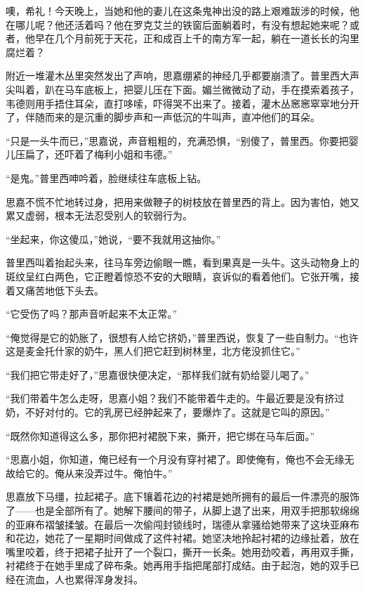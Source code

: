 \par 噢，希礼！今天晚上，当她和他的妻儿在这条鬼神出没的路上艰难跋涉的时候，他在哪儿呢？他还活着吗？他在罗克艾兰的铁窗后面躺着时，有没有想起她来呢？或者，他早在几个月前死于天花，正和成百上千的南方军一起，躺在一道长长的沟里腐烂着？
\par 附近一堆灌木丛里突然发出了声响，思嘉绷紧的神经几乎都要崩溃了。普里西大声尖叫着，趴在马车底板上，把婴儿压在下面。媚兰微微动了动，手在摸索着孩子，韦德则用手捂住耳朵，直打哆嗦，吓得哭不出来了。接着，灌木丛窸窸窣窣地分开了，伴随而来的是沉重的脚步声和一声低沉的牛叫声，直冲他们的耳朵。
\par “只是一头牛而已，”思嘉说，声音粗粗的，充满恐惧，“别傻了，普里西。你要把婴儿压扁了，还吓着了梅利小姐和韦德。”
\par “是鬼。”普里西呻吟着，脸继续往车底板上钻。
\par 思嘉不慌不忙地转过身，把用来做鞭子的树枝放在普里西的背上。因为害怕，她又累又虚弱，根本无法忍受别人的软弱行为。
\par “坐起来，你这傻瓜，”她说，“要不我就用这抽你。”
\par 普里西叫着抬起头来，往马车旁边偷眼一瞧，看到果真是一头牛。这头动物身上的斑纹呈红白两色，它正瞪着惊恐不安的大眼睛，哀诉似的看着他们。它张开嘴，接着又痛苦地低下头去。
\par “它受伤了吗？那声音听起来不太正常。”
\par “俺觉得是它的奶胀了，很想有人给它挤奶，”普里西说，恢复了一些自制力。“也许这是麦金托什家的奶牛，黑人们把它赶到树林里，北方佬没抓住它。”
\par “我们把它带走好了，”思嘉很快便决定，“那样我们就有奶给婴儿喝了。”
\par “我们带着牛怎么走呀，思嘉小姐？我们不能带着牛走的。牛最近要是没有挤过奶，不好对付的。它的乳房已经肿起来了，要爆炸了。这就是它叫的原因。”
\par “既然你知道得这么多，那你把衬裙脱下来，撕开，把它绑在马车后面。”
\par “思嘉小姐，你知道，俺已经有一个月没有穿衬裙了。即使俺有，俺也不会无缘无故给它的。俺从来没弄过牛。俺怕牛。”
\par 思嘉放下马缰，拉起裙子。底下镶着花边的衬裙是她所拥有的最后一件漂亮的服饰了——也是全部所有了。她解下腰间的带子，从脚上退了出来，用双手把那软绵绵的亚麻布褶皱揉皱。在最后一次偷闯封锁线时，瑞德从拿骚给她带来了这块亚麻布和花边，她花了一星期时间做成了这件衬裙。她坚决地拎起衬裙的边缘扯着，放在嘴里咬着，终于把裙子扯开了一个裂口，撕开一长条。她用劲咬着，再用双手撕，衬裙终于在她手里成了碎布条。她再用手指把尾部打成结。由于起泡，她的双手已经在流血，人也累得浑身发抖。

